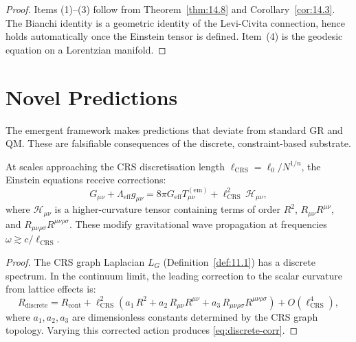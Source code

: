 \begin{proof}
Items (1)--(3) follow from Theorem~\ref{thm:14.8} and
Corollary~\ref{cor:14.3}.  The Bianchi identity is a geometric
identity of the Levi-Civita connection, hence holds automatically
once the Einstein tensor is defined.  Item~(4) is the geodesic
equation on a Lorentzian manifold.
\end{proof}

\section{Novel Predictions}
\label{sec:ch14:predictions}

The emergent framework makes predictions that deviate from standard
GR and QM.  These are falsifiable consequences of the discrete,
constraint-based substrate.

\begin{theorem}\label{thm:14.15}
At scales approaching the CRS discretisation length $\ell_{\mathrm{CRS}}
= \ell_0 / N^{1/n}$, the Einstein equations receive corrections:
\begin{equation}\label{eq:discrete-corr}
  G_{\mu\nu} + \Lambda_{\mathrm{eff}} g_{\mu\nu}
  = 8\pi G_{\mathrm{eff}} T_{\mu\nu}^{(\mathrm{em})}
  + \ell_{\mathrm{CRS}}^2\,\mathcal{H}_{\mu\nu},
\end{equation}
where $\mathcal{H}_{\mu\nu}$ is a higher-curvature tensor containing
terms of order $R^2$, $R_{\mu\nu}R^{\mu\nu}$, and
$R_{\mu\nu\rho\sigma}R^{\mu\nu\rho\sigma}$.  These modify
gravitational wave propagation at frequencies
$\omega \gtrsim c / \ell_{\mathrm{CRS}}$.
\end{theorem}

\begin{proof}
The CRS graph Laplacian $L_G$ (Definition~\ref{def:11.1}) has a
discrete spectrum.  In the continuum limit, the leading correction
to the scalar curvature from lattice effects is:
\[
  R_{\mathrm{discrete}} = R_{\mathrm{cont}}
  + \ell_{\mathrm{CRS}}^2\left(
    a_1\,R^2 + a_2\,R_{\mu\nu}R^{\mu\nu}
    + a_3\,R_{\mu\nu\rho\sigma}R^{\mu\nu\rho\sigma}
  \right) + O(\ell_{\mathrm{CRS}}^4),
\]
where $a_1, a_2, a_3$ are dimensionless constants determined by the
CRS graph topology.  Varying this corrected action produces
\eqref{eq:discrete-corr}.
\end{proof}

